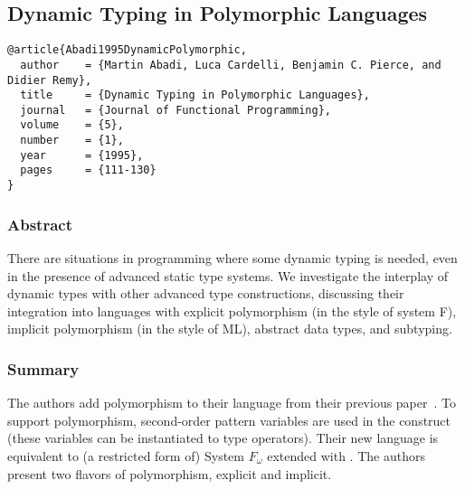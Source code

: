 \documentclass[12pt]{article}	%
\begin{document}






\subsection*{Dynamic Typing in Polymorphic Languages~\cite{Abadi1995DynamicPolymorphic}}

\begin{verbatim}
@article{Abadi1995DynamicPolymorphic,
  author    = {Martin Abadi, Luca Cardelli, Benjamin C. Pierce, and Didier Remy},
  title     = {Dynamic Typing in Polymorphic Languages},
  journal   = {Journal of Functional Programming},
  volume    = {5},
  number    = {1},
  year      = {1995},
  pages     = {111-130}
}
\end{verbatim}

\subsubsection*{Abstract}
There are situations in programming where some dynamic typing is needed, even in the presence of advanced static type systems. We investigate the interplay of dynamic types with other advanced type constructions, discussing their integration into languages with explicit polymorphism (in the style of system F), implicit polymorphism (in the style of ML), abstract data types, and subtyping.

\subsubsection*{Summary}
The authors add polymorphism to their language from their previous paper~\cite{Abadi1991Dynamic}. To support polymorphism, second-order pattern variables are used in the \typecase construct (these variables can be instantiated to type operators). Their new language is equivalent to (a restricted form of) System $F_\omega$ extended with \Dynamic. The authors present two flavors of polymorphism, explicit and implicit.
\end{document}
